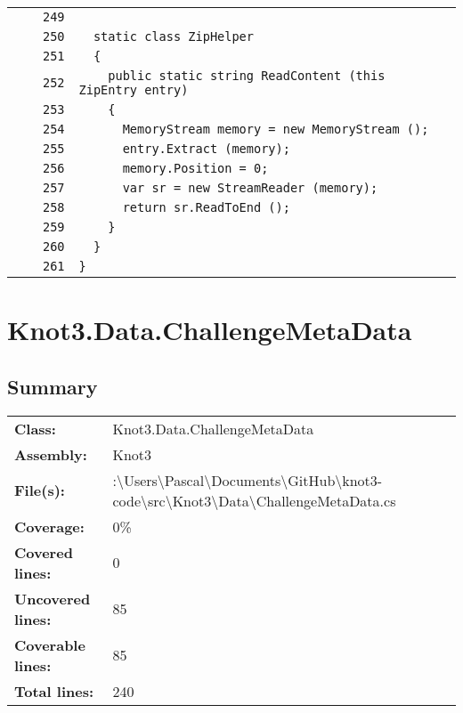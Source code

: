 \documentclass[a4paper,10pt]{article}
\begin{document}
\begin{longtable}[l]{lrrl}
\cellcolor{gray} &  & \verb~249~ & \verb~~\\
\cellcolor{gray} &  & \verb~250~ & \verb~  static class ZipHelper~\\
\cellcolor{gray} &  & \verb~251~ & \verb~  {~\\
\cellcolor{gray} &  & \verb~252~ & \verb~    public static string ReadContent (this ZipEntry entry)~\\
\cellcolor{gray} &  & \verb~253~ & \verb~    {~\\
\cellcolor{gray} &  & \verb~254~ & \verb~      MemoryStream memory = new MemoryStream ();~\\
\cellcolor{gray} &  & \verb~255~ & \verb~      entry.Extract (memory);~\\
\cellcolor{gray} &  & \verb~256~ & \verb~      memory.Position = 0;~\\
\cellcolor{gray} &  & \verb~257~ & \verb~      var sr = new StreamReader (memory);~\\
\cellcolor{gray} &  & \verb~258~ & \verb~      return sr.ReadToEnd ();~\\
\cellcolor{gray} &  & \verb~259~ & \verb~    }~\\
\cellcolor{gray} &  & \verb~260~ & \verb~  }~\\
\cellcolor{gray} &  & \verb~261~ & \verb~}~\\
\end{longtable}
\newpage
\section{Knot3.Data.ChallengeMetaData}
\subsection{Summary}
\begin{longtable}[l]{ll}
\textbf{Class:} & Knot3.Data.ChallengeMetaData\\
\textbf{Assembly:} & Knot3\\
\textbf{File(s):} & \begin{minipage}[t]{12cm}{:\textbackslash Users\textbackslash Pascal\textbackslash Documents\textbackslash GitHub\textbackslash knot3-code\textbackslash src\textbackslash Knot3\textbackslash Data\textbackslash ChallengeMetaData.cs}\end{minipage} \\
\textbf{Coverage:} & 0\%\\
\textbf{Covered lines:} & 0\\
\textbf{Uncovered lines:} & 85\\
\textbf{Coverable lines:} & 85\\
\textbf{Total lines:} & 240\\
\end{longtable}
\end{document}
